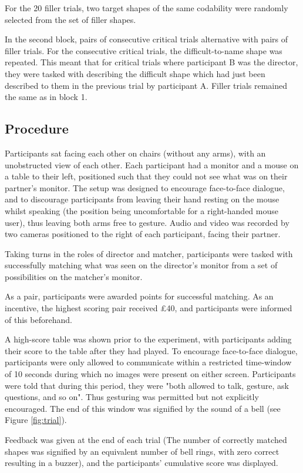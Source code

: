 \documentclass[a4paper,man,natbib]{apa6}
\begin{document}
For the 20 filler trials, two target shapes of the same codability were randomly selected from the set of filler shapes.

In the second block, pairs of consecutive critical trials alternative with pairs of filler trials. 
For the consecutive critical trials, the difficult-to-name shape was repeated.
This meant that for critical trials where participant B was the director, they were tasked with describing the difficult shape which had just been described to them in the previous trial by participant A.
Filler trials remained the same as in block 1. 


\subsection{Procedure}
Participants sat facing each other on chairs (without any arms), with an unobstructed view of each other.
Each participant had a monitor and a mouse on a table to their left, positioned such that they could not see what was on their partner's monitor.
The setup was designed to encourage face-to-face dialogue, and to discourage participants from leaving their hand resting on the mouse whilst speaking (the position being uncomfortable for a right-handed mouse user), thus leaving both arms free to gesture.
Audio and video was recorded by two cameras positioned to the right of each participant, facing their partner.

Taking turns in the roles of director and matcher, participants were tasked with successfully matching what was seen on the director's monitor from a set of possibilities on the matcher's monitor.

As a pair, participants were awarded points for successful matching.
As an incentive, the highest scoring pair received £40, and participants were informed of this beforehand.

A high-score table was shown prior to the experiment, with participants adding their score to the table after they had played.
To encourage face-to-face dialogue, participants were only allowed to communicate within a restricted time-window of 10 seconds during which no images were present on either screen. 
Participants were told that during this period, they were "both allowed to talk, gesture, ask questions, and so on". 
Thus gesturing was permitted but not explicitly encouraged.
The end of this window was signified by the sound of a bell (see Figure \ref{fig:trial}).

Feedback was given at the end of each trial (The number of correctly matched shapes was signified by an equivalent number of bell rings, with zero correct resulting in a buzzer), and the participants' cumulative score was displayed.
\end{document}
